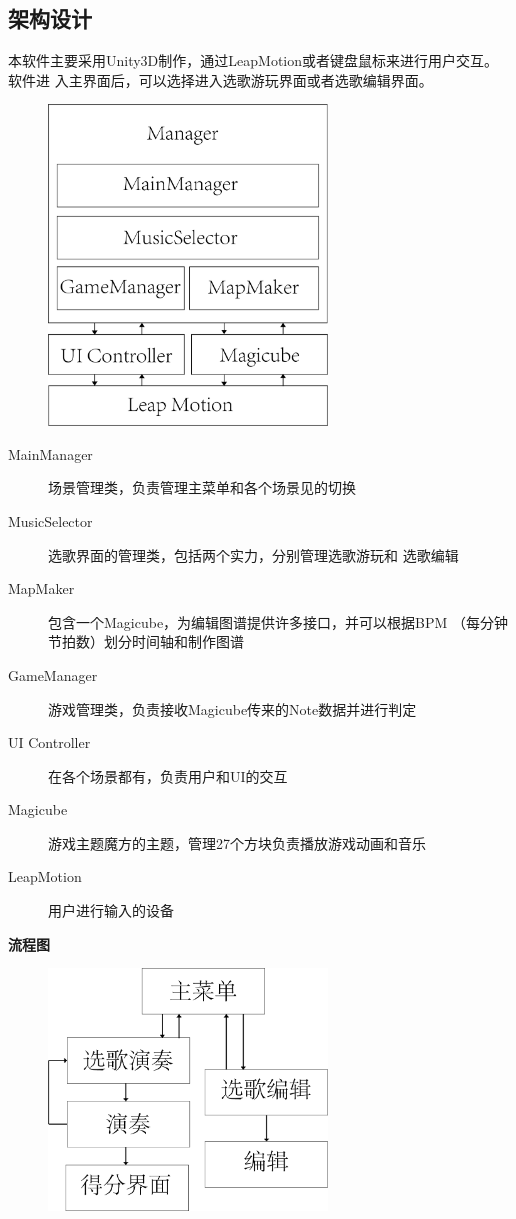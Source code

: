 \documentclass{article}
\begin{document}
\subsection{架构设计}
本软件主要采用Unity3D制作，通过LeapMotion或者键盘鼠标来进行用户交互。软件进
入主界面后，可以选择进入选歌游玩界面或者选歌编辑界面。
\begin{figure}[H]
  \centering
  \includegraphics[width=20em]{arc-new.png}\\
  \caption{}\label{}
\end{figure}
\begin{description}
  \item[MainManager] 场景管理类，负责管理主菜单和各个场景见的切换
  \item[MusicSelector] 选歌界面的管理类，包括两个实力，分别管理选歌游玩和
      选歌编辑
  \item[MapMaker] 包含一个Magicube，为编辑图谱提供许多接口，并可以根据BPM
      （每分钟节拍数）划分时间轴和制作图谱
  \item[GameManager] 游戏管理类，负责接收Magicube传来的Note数据并进行判定
  \item[UI Controller] 在各个场景都有，负责用户和UI的交互
  \item[Magicube] 游戏主题魔方的主题，管理27个方块负责播放游戏动画和音乐
  \item[LeapMotion] 用户进行输入的设备
\end{description}
\textbf{流程图}
\begin{figure}[H]
  \centering
  \includegraphics[width=20em]{progress.png}\\
  \caption{}\label{}
\end{figure}
\end{document}
